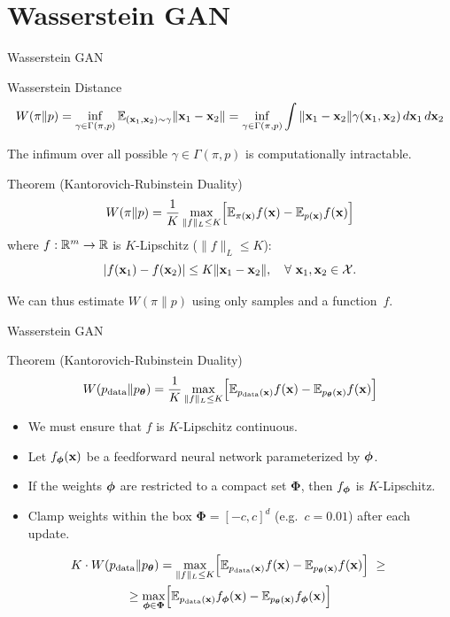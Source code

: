 \documentclass{beamer}
\renewcommand{\eqpause}{}
\begin{document}
\section{Wasserstein GAN}
\begin{frame}{Wasserstein GAN}
	\begin{block}{Wasserstein Distance}
		\vspace{-0.5cm}
		\small
		\[
		W(\pi \| p) = \inf_{\gamma \in \Gamma(\pi, p)} \mathbb{E}_{(\mathbf{x}_1, \mathbf{x}_2) \sim \gamma} \| \mathbf{x}_1 - \mathbf{x}_2 \| =  \inf_{\gamma \in \Gamma(\pi, p)} \int \|\mathbf{x}_1 - \mathbf{x}_2\| \gamma (\mathbf{x}_1, \mathbf{x}_2)\, d\mathbf{x}_1\, d\mathbf{x}_2
		\]
		\vspace{-0.3cm}
	\end{block}
	\eqpause
	The infimum over all possible $\gamma \in \Gamma(\pi, p)$ is computationally intractable.
	\eqpause
	\begin{block}{Theorem (Kantorovich-Rubinstein Duality)}
		\vspace{-0.3cm}
		\[
			W(\pi \| p) = \frac{1}{K} \max_{\| f \|_L \leq K} \Bigl[ \mathbb{E}_{\pi(\mathbf{x})} f(\mathbf{x})  - \mathbb{E}_{p(\mathbf{x})} f(\mathbf{x})\Bigr]
		\]
		where $f : \mathbb{R}^m \rightarrow \mathbb{R}$ is $K$-Lipschitz ($\|f\|_L \leq K$):
		\[
			|f(\mathbf{x}_1) - f(\mathbf{x}_2)| \leq K \|\mathbf{x}_1 - \mathbf{x}_2\|,\quad \forall\ \mathbf{x}_1, \mathbf{x}_2 \in \mathcal{X}.
		\]
		\vspace{-0.6cm}
	\end{block}
	\eqpause
	We can thus estimate $W(\pi \| p)$ using only samples and a function~$f$.
\end{frame}
\begin{frame}{Wasserstein GAN}
	\begin{block}{Theorem (Kantorovich-Rubinstein Duality)}
		\[
		W(p_{\text{data}} \| p_{\boldsymbol{\theta}}) = \frac{1}{K} \max_{\| f \|_L \leq K} \Bigl[ \mathbb{E}_{p_{\text{data}}(\mathbf{x})} f(\mathbf{x})  - \mathbb{E}_{p_{\boldsymbol{\theta}}(\mathbf{x})} f(\mathbf{x})\Bigr]
		\]
	\end{block}
	\begin{itemize}
		\item We must ensure that $f$ is $K$-Lipschitz continuous.
		\item Let $f_{\boldsymbol{\phi}}(\mathbf{x})$ be a feedforward neural network parameterized by $\boldsymbol{\phi}$.
		\item If the weights $\boldsymbol{\phi}$ are restricted to a compact set $\boldsymbol{\Phi}$, then $f_{\boldsymbol{\phi}}$ is $K$-Lipschitz.
		\eqpause
		\item Clamp weights within the box $\boldsymbol{\Phi} = [-c, c]^d$ (e.g.\ $c = 0.01$) after each update.
	\end{itemize}
	\begin{multline*}
		K \cdot W(\pd \| \pt) = \max_{\| f \|_L \leq K} \Bigl[ \bbE_{\pd(\bx)} f(\bx)  - \bbE_{\pt(\bx)} f(\bx)\Bigr]\ \geq\ 
		\\  \geq \max_{\bphi \in \boldsymbol{\Phi}} \Bigl[ \bbE_{\pd(\bx)} f_{\bphi}(\bx)  - \bbE_{\pt(\bx)} f_{\bphi}(\bx)\Bigr]
	\end{multline*}
\end{frame}
\end{document}
